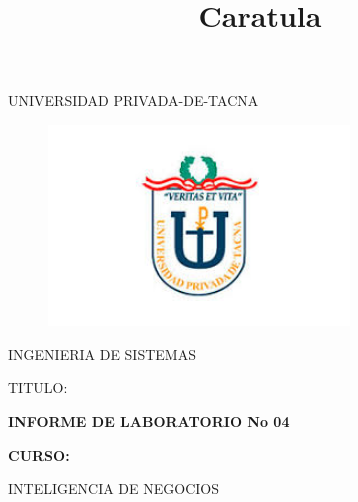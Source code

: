 \documentclass[12pt,letterpaper]{article}
\begin{document}
%


\title{Caratula}

\begin{titlepage}
\begin{center}
\large{UNIVERSIDAD PRIVADA-DE-TACNA}\\
\vspace*{-0.025in}
\begin{figure}[htb]
\begin{center}
\includegraphics[width=8cm]{./Imagenes/logo}
\end{center}
\end{figure}
\vspace*{0.15in}
INGENIERIA DE SISTEMAS  \\

\vspace*{0.5in}
\begin{large}
TITULO:\\
\end{large}

\vspace*{0.1in}
\begin{Large}
\textbf{INFORME DE LABORATORIO No 04} \\
\end{Large}

\vspace*{0.3in}
\begin{Large}
\textbf{CURSO:} \\
\end{Large}

\vspace*{0.1in}
\begin{large}
INTELIGENCIA DE NEGOCIOS\\
\end{large}


\end{center}
\end{titlepage}
\end{document}
